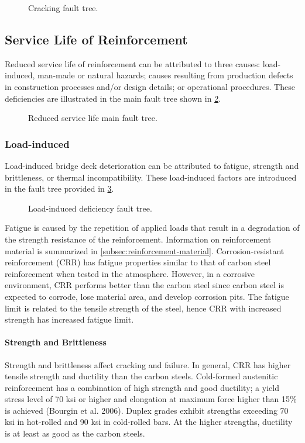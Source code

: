 \begin{figure}
  \caption{Cracking fault tree.}
  \label{fig:fault-tree-cracking} 
\end{figure}


\subsection{Service Life of Reinforcement}
Reduced service life of reinforcement can be attributed to three causes: load-induced, man-made or natural hazards; causes resulting from production defects in construction processes and/or design details; or operational procedures. These deficiencies are illustrated in the main fault tree shown in \cref{fig:fault-tree-reduced-main}.

\begin{figure}
  \caption{Reduced service life main fault tree.}
  \label{fig:fault-tree-reduced-main} 
\end{figure}

\subsubsection{Load-induced}
Load-induced bridge deck deterioration can be attributed to fatigue, strength and brittleness, or thermal
incompatibility. These load-induced factors are introduced in the fault tree provided in \cref{fig:fault-tree-load-induced}.

\begin{figure}
  \caption{Load-induced deficiency fault tree.}
  \label{fig:fault-tree-load-induced} 
\end{figure}

Fatigue is caused by the repetition of applied loads that result in a degradation of the strength resistance of the reinforcement. Information on reinforcement material is summarized in \cref{subsec:reinforcement-material}. Corrosion-resistant reinforcement (CRR) has fatigue properties similar to that of carbon steel reinforcement when tested in the atmosphere. However, in a corrosive environment, CRR performs better than the carbon steel since carbon steel is expected to corrode, lose material area, and develop corrosion pits. The fatigue limit is related to the tensile strength of the steel, hence CRR with increased strength has increased fatigue limit.

\paragraph{Strength and Brittleness}
Strength and brittleness affect cracking and failure. In general, CRR has higher tensile strength and ductility than the carbon steels. Cold-formed austenitic reinforcement has a combination of high strength and good ductility; a yield stress level of 70 ksi or higher and elongation at maximum force higher than 15\% is achieved (Bourgin et al. 2006). Duplex grades exhibit strengths exceeding 70 ksi in hot-rolled and 90 ksi in cold-rolled bars. At the higher strengths, ductility is at least as good as the carbon steels.

